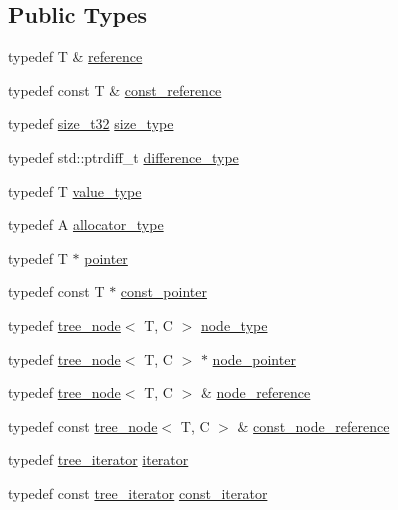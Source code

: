 \subsection*{Public Types}
\begin{DoxyCompactItemize}
\item 
typedef T \& \hyperlink{classcrap_1_1binary__tree_ad64c4256e3563cf0f8147ba5927018a1}{reference}
\item 
typedef const T \& \hyperlink{classcrap_1_1binary__tree_a0fa18b1ab1bd0759b57e95b3804cce9a}{const\-\_\-reference}
\item 
typedef \hyperlink{types_8h_a38c0a12279ffe0fabec44939e753c914}{size\-\_\-t32} \hyperlink{classcrap_1_1binary__tree_a7157228ff412e3fcf54a972120b7186a}{size\-\_\-type}
\item 
typedef std\-::ptrdiff\-\_\-t \hyperlink{classcrap_1_1binary__tree_a3c4aa7c126382d25766449ad4f9a769a}{difference\-\_\-type}
\item 
typedef T \hyperlink{classcrap_1_1binary__tree_a960493f90034de3a093bcbd5213afc7b}{value\-\_\-type}
\item 
typedef A \hyperlink{classcrap_1_1binary__tree_a0f57ad15240003da41b5893f4dd16d89}{allocator\-\_\-type}
\item 
typedef T $\ast$ \hyperlink{classcrap_1_1binary__tree_a27c6670d79fa1c757ce7c58025e582f8}{pointer}
\item 
typedef const T $\ast$ \hyperlink{classcrap_1_1binary__tree_a04d16c3f500fd5357170370c38526c54}{const\-\_\-pointer}
\item 
typedef \hyperlink{structcrap_1_1tree__node}{tree\-\_\-node}$<$ T, C $>$ \hyperlink{classcrap_1_1binary__tree_af74d1c1e3ed6600af0dcc454c7d41757}{node\-\_\-type}
\item 
typedef \hyperlink{structcrap_1_1tree__node}{tree\-\_\-node}$<$ T, C $>$ $\ast$ \hyperlink{classcrap_1_1binary__tree_a04d7ea4aa1c1cc5bdd06cbdf3d537076}{node\-\_\-pointer}
\item 
typedef \hyperlink{structcrap_1_1tree__node}{tree\-\_\-node}$<$ T, C $>$ \& \hyperlink{classcrap_1_1binary__tree_a4ff11fd56b34d6ed682f63e6d3ac66b1}{node\-\_\-reference}
\item 
typedef const \hyperlink{structcrap_1_1tree__node}{tree\-\_\-node}$<$ T, C $>$ \& \hyperlink{classcrap_1_1binary__tree_a2a0da5e341fa47ba7c7f47d784a6761b}{const\-\_\-node\-\_\-reference}
\item 
typedef \hyperlink{structcrap_1_1binary__tree_1_1tree__iterator}{tree\-\_\-iterator} \hyperlink{classcrap_1_1binary__tree_af3313f011a64bb5a945dcd39cc3fc3c3}{iterator}
\item 
typedef const \hyperlink{structcrap_1_1binary__tree_1_1tree__iterator}{tree\-\_\-iterator} \hyperlink{classcrap_1_1binary__tree_aa9b9a8c0dd4bb6c574ea0526040e7c50}{const\-\_\-iterator}
\end{DoxyCompactItemize}
